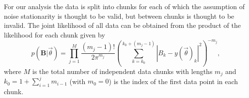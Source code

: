 For our analysis the data is split into chunks for each of which the assumption of noise stationarity is
thought to be valid, but between chunks is thought to be invalid. The joint likelihood of all data can be
obtained from the product of the likelihood for each chunk given by
\begin{equation}\label{eq:prod}
p(\mathbf{B}|\vec{\theta}) = \prod_{j=1}^M \frac{(m_j-1)!}{2\pi^{m_j}}
\left(\sum_{k=k_0}^{k_0+(m_j-1)} |B_k-y(\vec{\theta})_k|^2\right)^{-m_j},
\end{equation}
where $M$ is the total number of independent data chunks with lengths $m_j$ and $k_0 = 1+\sum_{i=1}^{j}
m_{i-1}$ (with $m_0 = 0$) is the index of the first data point in each chunk.

  
  
  